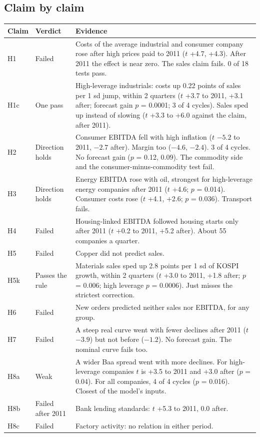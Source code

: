 \documentclass[11pt,a4paper]{article}
\begin{document}
\subsection*{Claim by claim}
\begin{center}\small
\begin{tabularx}{\linewidth}{@{}l>{\raggedright}p{2.2cm}X@{}}\toprule
Claim & Verdict & Evidence \\\midrule
H1 & \color{bad}Failed & Costs of the average industrial and consumer company rose after high prices paid to 2011 ($t$ +4.7, +4.3). After 2011 the effect is near zero. The sales claim fails. 0 of 18 tests pass. \\
H1c & \color{good}One pass & High-leverage industrials: costs up 0.22 points of sales per 1 sd jump, within 2 quarters ($t$ +3.7 to 2011, +3.1 after; forecast gain $p$ = 0.0001; 3 of 4 cycles). Sales sped up instead of slowing ($t$ +3.3 to +6.0 against the claim, after 2011). \\
H2 & \color{good}Direction holds & Consumer EBITDA fell with high inflation ($t$ $-5.2$ to 2011, $-2.7$ after). Margin too ($-4.6$, $-2.4$). 3 of 4 cycles. No forecast gain ($p$ = 0.12, 0.09). The commodity side and the consumer-minus-commodity test fail. \\
H3 & \color{good}Direction holds & Energy EBITDA rose with oil, strongest for high-leverage energy companies after 2011 ($t$ +4.6; $p$ = 0.014). Consumer costs rose ($t$ +4.1, +2.6; $p$ = 0.036). Transport fails. \\
H4 & \color{bad}Failed & Housing-linked EBITDA followed housing starts only after 2011 ($t$ +0.2 to 2011, +5.2 after). About 55 companies a quarter. \\
H5 & \color{bad}Failed & Copper did not predict sales. \\
H5k & \color{good}Passes the rule & Materials sales sped up 2.8 points per 1 sd of KOSPI growth, within 2 quarters ($t$ +3.0 to 2011, +1.8 after; $p$ = 0.006; high leverage $p$ = 0.0006). Just misses the strictest correction. \\
H6 & \color{bad}Failed & New orders predicted neither sales nor EBITDA, for any group. \\
H7 & \color{bad}Failed & A steep real curve went with fewer declines after 2011 ($t$ $-3.9$) but not before ($-1.2$). No forecast gain. The nominal curve fails too. \\
H8a & Weak & A wider Baa spread went with more declines. For high-leverage companies $t$ is +3.5 to 2011 and +3.0 after ($p$ = 0.04). For all companies, 4 of 4 cycles ($p$ = 0.016). Closest of the model's inputs. \\
H8b & \color{bad}Failed after 2011 & Bank lending standards: $t$ +5.3 to 2011, 0.0 after. \\
H8c & \color{bad}Failed & Factory activity: no relation in either period. \\\bottomrule
\end{tabularx}
\end{center}
\end{document}
